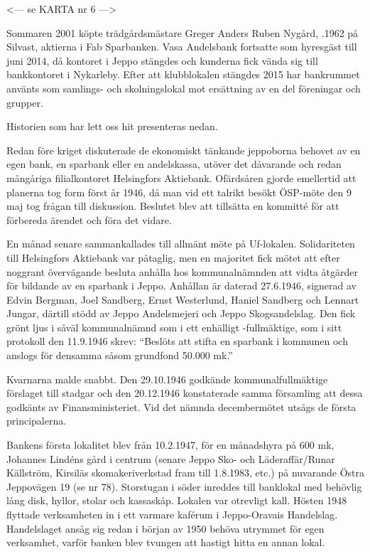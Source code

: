 
<--- se KARTA nr 6 --->




Sommaren 2001 köpte trädgårdsmästare Greger Anders Ruben	Nygård, .1962 på Silvast, aktierna i Fab Sparbanken. Vasa 	Andelsbank fortsatte som hyresgäst till juni 2014, då kontoret i Jeppo stängdes och kunderna fick vända sig till bankkontoret i Nykarleby. Efter att klubblokalen stängdes 2015 har bankrummet använts som samlings- och skolningslokal mot ersättning av en del föreningar och grupper.

Historien som har lett oss hit presenteras nedan.




Redan före kriget diskuterade de ekonomiskt tänkande jeppoborna behovet av en egen bank, en sparbank eller en andelskassa, utöver det dåvarande och redan mångåriga filialkontoret Helsingfors Aktiebank. Ofärdsåren gjorde emellertid att planerna tog form först år 1946, då man vid ett talrikt besökt ÖSP-möte den 9 maj tog frågan till diskussion. Beslutet blev att tillsätta en kommitté för att förbereda ärendet och föra det vidare.

En månad senare sammankallades till allmänt möte på Uf-lokalen. Solidariteten till Helsingfors Aktiebank var påtaglig, men en majoritet fick mötet att efter noggrant övervägande besluta anhålla hos kommunalnämnden att vidta åtgärder för bildande av en sparbank i Jeppo. Anhållan är daterad 27.6.1946, signerad av Edvin Bergman, Joel Sandberg, Ernst Westerlund, Haniel Sandberg och Lennart Jungar, därtill stödd av Jeppo Andelsmejeri och Jeppo Skogsandelslag. Den fick grönt ljus i såväl kommunalnämnd som i ett enhälligt -fullmäktige, som i sitt protokoll den 11.9.1946 skrev: ``Beslöts att stifta en sparbank i kommunen och anslogs för densamma såsom grundfond 50.000 mk.''

Kvarnarna malde snabbt. Den 29.10.1946 godkände kommunalfullmäktige förslaget till stadgar och den 20.12.1946 konstaterade samma församling att dessa godkänts av Finansministeriet. Vid det nämnda decembermötet utsågs de första principalerna.

Bankens första lokalitet blev från 10.2.1947, för en månadshyra på 600 mk, Johannes Lindéns gård i centrum (senare Jeppo Sko- och Läderaffär/Runar Källström, Kirsiläs skomakeriverkstad fram till 1.8.1983, etc.) på nuvarande Östra Jeppovägen 19 (se nr 78). Storstugan i söder inreddes till banklokal med behövlig lång disk, hyllor, stolar och kassaskåp. Lokalen var otrevligt kall. Hösten 1948 flyttade verksamheten in i ett varmare kaférum i Jeppo-Oravais Handelslag. Handelslaget ansåg sig redan i början av 1950 behöva utrymmet för egen verksamhet, varför banken blev tvungen att hastigt hitta en annan lokal.

